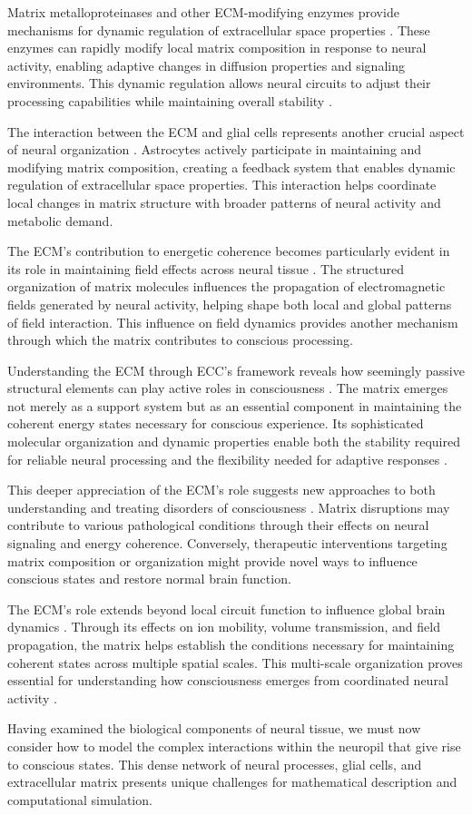 Matrix metalloproteinases and other ECM-modifying enzymes provide mechanisms for dynamic regulation of extracellular space properties \cite{Dityatev2003}. These enzymes can rapidly modify local matrix composition in response to neural activity, enabling adaptive changes in diffusion properties and signaling environments. This dynamic regulation allows neural circuits to adjust their processing capabilities while maintaining overall stability \cite{Song2018}.

The interaction between the ECM and glial cells represents another crucial aspect of neural organization \cite{Vargova2014}. Astrocytes actively participate in maintaining and modifying matrix composition, creating a feedback system that enables dynamic regulation of extracellular space properties. This interaction helps coordinate local changes in matrix structure with broader patterns of neural activity and metabolic demand.

The ECM's contribution to energetic coherence becomes particularly evident in its role in maintaining field effects across neural tissue \cite{Sykova2008}. The structured organization of matrix molecules influences the propagation of electromagnetic fields generated by neural activity, helping shape both local and global patterns of field interaction. This influence on field dynamics provides another mechanism through which the matrix contributes to conscious processing.

Understanding the ECM through ECC's framework reveals how seemingly passive structural elements can play active roles in consciousness \cite{Dityatev2010}. The matrix emerges not merely as a support system but as an essential component in maintaining the coherent energy states necessary for conscious experience. Its sophisticated molecular organization and dynamic properties enable both the stability required for reliable neural processing and the flexibility needed for adaptive responses \cite{Frischknecht2012}.

This deeper appreciation of the ECM's role suggests new approaches to both understanding and treating disorders of consciousness \cite{Burnside2014}. Matrix disruptions may contribute to various pathological conditions through their effects on neural signaling and energy coherence. Conversely, therapeutic interventions targeting matrix composition or organization might provide novel ways to influence conscious states and restore normal brain function.

The ECM's role extends beyond local circuit function to influence global brain dynamics \cite{Barros2011}. Through its effects on ion mobility, volume transmission, and field propagation, the matrix helps establish the conditions necessary for maintaining coherent states across multiple spatial scales. This multi-scale organization proves essential for understanding how consciousness emerges from coordinated neural activity \cite{Zimmermann2008}.

Having examined the biological components of neural tissue, we must now consider how to model the complex interactions within the neuropil that give rise to conscious states. This dense network of neural processes, glial cells, and extracellular matrix presents unique challenges for mathematical description and computational simulation.